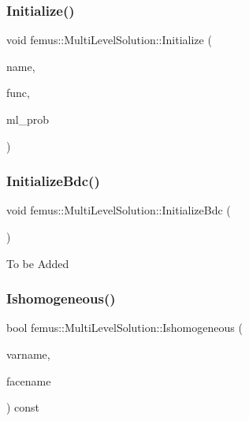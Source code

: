 \subsubsection{\texorpdfstring{Initialize()}{Initialize()}\hspace{0.1cm}{\footnotesize\ttfamily [3/3]}}
{\footnotesize\ttfamily void femus\+::\+Multi\+Level\+Solution\+::\+Initialize (\begin{DoxyParamCaption}\item[{const char $\ast$}]{name,  }\item[{Init\+Func\+M\+L\+Prob}]{func,  }\item[{const \mbox{\hyperlink{classfemus_1_1_multi_level_problem}{Multi\+Level\+Problem}} $\ast$}]{ml\+\_\+prob }\end{DoxyParamCaption})}

\mbox{\label{classfemus_1_1_multi_level_solution_a7dab34eb82a90ff8035142048e9284e8}} 
\subsubsection{\texorpdfstring{Initialize\+Bdc()}{InitializeBdc()}}
{\footnotesize\ttfamily void femus\+::\+Multi\+Level\+Solution\+::\+Initialize\+Bdc (\begin{DoxyParamCaption}{ }\end{DoxyParamCaption})}

To be Added \mbox{\label{classfemus_1_1_multi_level_solution_ac275b90171e6a33628c4fe5ebf9860a1}} 
\subsubsection{\texorpdfstring{Ishomogeneous()}{Ishomogeneous()}}
{\footnotesize\ttfamily bool femus\+::\+Multi\+Level\+Solution\+::\+Ishomogeneous (\begin{DoxyParamCaption}\item[{const std\+::string}]{varname,  }\item[{const unsigned int}]{facename }\end{DoxyParamCaption}) const\hspace{0.3cm}{\ttfamily [inline]}}

